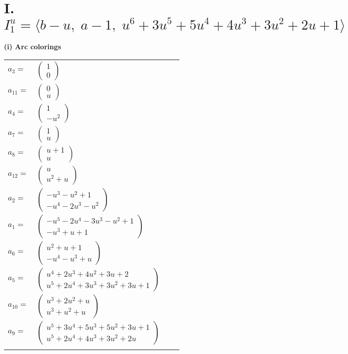 \documentclass[1p]{elsarticle_modified}
\theoremstyle{definition}
\begin{document}
\newpage
\renewcommand{\arraystretch}{1}
\centering \section*{I. $I^u_{1}= \langle b- u,\;a-1,\;u^6+3 u^5+5 u^4+4 u^3+3 u^2+2 u+1 \rangle$}
\flushleft \textbf{(i) Arc colorings}\\
\begin{tabular}{m{7pt} m{180pt} m{7pt} m{180pt} }
\flushright $a_{3}=$&$\begin{pmatrix}1\\0\end{pmatrix}$ \\
\flushright $a_{11}=$&$\begin{pmatrix}0\\u\end{pmatrix}$ \\
\flushright $a_{4}=$&$\begin{pmatrix}1\\- u^2\end{pmatrix}$ \\
\flushright $a_{7}=$&$\begin{pmatrix}1\\u\end{pmatrix}$ \\
\flushright $a_{8}=$&$\begin{pmatrix}u+1\\u\end{pmatrix}$ \\
\flushright $a_{12}=$&$\begin{pmatrix}u\\u^2+u\end{pmatrix}$ \\
\flushright $a_{2}=$&$\begin{pmatrix}- u^3- u^2+1\\- u^4-2 u^3- u^2\end{pmatrix}$ \\
\flushright $a_{1}=$&$\begin{pmatrix}- u^5-2 u^4-3 u^3- u^2+1\\- u^3+u+1\end{pmatrix}$ \\
\flushright $a_{6}=$&$\begin{pmatrix}u^2+u+1\\- u^4- u^3+u\end{pmatrix}$ \\
\flushright $a_{5}=$&$\begin{pmatrix}u^4+2 u^3+4 u^2+3 u+2\\u^5+2 u^4+3 u^3+3 u^2+3 u+1\end{pmatrix}$ \\
\flushright $a_{10}=$&$\begin{pmatrix}u^3+2 u^2+u\\u^3+u^2+u\end{pmatrix}$ \\
\flushright $a_{9}=$&$\begin{pmatrix}u^5+3 u^4+5 u^3+5 u^2+3 u+1\\u^5+2 u^4+4 u^3+3 u^2+2 u\end{pmatrix}$\\&\end{tabular}
\end{document}
